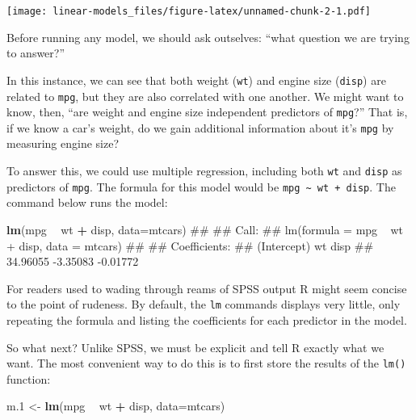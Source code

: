 \documentclass[]{article}
\newenvironment{Shaded}{\begin{snugshade}}{\end{snugshade}}
\newcommand{\KeywordTok}[1]{\textcolor[rgb]{0.13,0.29,0.53}{\textbf{#1}}}
\newcommand{\DataTypeTok}[1]{\textcolor[rgb]{0.13,0.29,0.53}{#1}}
\newcommand{\DecValTok}[1]{\textcolor[rgb]{0.00,0.00,0.81}{#1}}
\newcommand{\StringTok}[1]{\textcolor[rgb]{0.31,0.60,0.02}{#1}}
\newcommand{\OperatorTok}[1]{\textcolor[rgb]{0.81,0.36,0.00}{\textbf{#1}}}
\newcommand{\NormalTok}[1]{#1}
\theoremstyle{definition}
\theoremstyle{definition}
\theoremstyle{definition}
\theoremstyle{remark}
\begin{document}
\texttt{[image: linear-models\_files/figure-latex/unnamed-chunk-2-1.pdf]}

Before running any model, we should ask outselves: ``what question we
are trying to answer?''

In this instance, we can see that both weight (\texttt{wt}) and engine
size (\texttt{disp}) are related to \texttt{mpg}, but they are also
correlated with one another. We might want to know, then, ``are weight
and engine size independent predictors of \texttt{mpg}?'' That is, if we
know a car's weight, do we gain additional information about it's
\texttt{mpg} by measuring engine size?

To answer this, we could use multiple regression, including both
\texttt{wt} and \texttt{disp} as predictors of \texttt{mpg}. The formula
for this model would be \texttt{mpg\ \textasciitilde{}\ wt\ +\ disp}.
The command below runs the model:

\begin{Shaded}
\begin{Highlighting}[]
\KeywordTok{lm}\NormalTok{(mpg }\OperatorTok{~}\StringTok{ }\NormalTok{wt }\OperatorTok{+}\StringTok{ }\NormalTok{disp, }\DataTypeTok{data=}\NormalTok{mtcars)}
\NormalTok{## }
\NormalTok{## Call:}
\NormalTok{## lm(formula = mpg ~ wt + disp, data = mtcars)}
\NormalTok{## }
\NormalTok{## Coefficients:}
\NormalTok{## (Intercept)           wt         disp  }
\NormalTok{##    34.96055     -3.35083     -0.01772}
\end{Highlighting}
\end{Shaded}

For readers used to wading through reams of SPSS output R might seem
concise to the point of rudeness. By default, the \texttt{lm} commands
displays very little, only repeating the formula and listing the
coefficients for each predictor in the model.

So what next? Unlike SPSS, we must be explicit and tell R exactly what
we want. The most convenient way to do this is to first store the
results of the \texttt{lm()} function:

\begin{Shaded}
\begin{Highlighting}[]
\NormalTok{m.}\DecValTok{1}\NormalTok{ <-}\StringTok{ }\KeywordTok{lm}\NormalTok{(mpg }\OperatorTok{~}\StringTok{ }\NormalTok{wt }\OperatorTok{+}\StringTok{ }\NormalTok{disp, }\DataTypeTok{data=}\NormalTok{mtcars)}
\end{Highlighting}
\end{Shaded}
\end{document}
